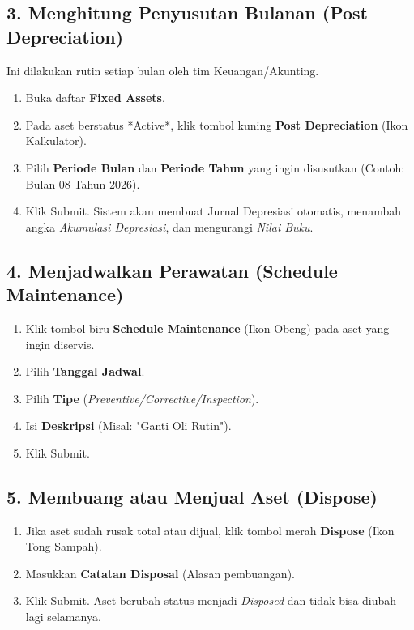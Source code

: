 \subsection{3. Menghitung Penyusutan Bulanan (Post Depreciation)}
Ini dilakukan rutin setiap bulan oleh tim Keuangan/Akunting.
\begin{enumerate}
    \item Buka daftar \textbf{Fixed Assets}.
    \item Pada aset berstatus *Active*, klik tombol kuning \textbf{Post Depreciation} (Ikon Kalkulator).
    \item Pilih \textbf{Periode Bulan} dan \textbf{Periode Tahun} yang ingin disusutkan (Contoh: Bulan 08 Tahun 2026).
    \item Klik Submit. Sistem akan membuat Jurnal Depresiasi otomatis, menambah angka \textit{Akumulasi Depresiasi}, dan mengurangi \textit{Nilai Buku}.
\end{enumerate}

\subsection{4. Menjadwalkan Perawatan (Schedule Maintenance)}
\begin{enumerate}
    \item Klik tombol biru \textbf{Schedule Maintenance} (Ikon Obeng) pada aset yang ingin diservis.
    \item Pilih \textbf{Tanggal Jadwal}.
    \item Pilih \textbf{Tipe} (\textit{Preventive/Corrective/Inspection}).
    \item Isi \textbf{Deskripsi} (Misal: "Ganti Oli Rutin").
    \item Klik Submit.
\end{enumerate}

\subsection{5. Membuang atau Menjual Aset (Dispose)}
\begin{enumerate}
    \item Jika aset sudah rusak total atau dijual, klik tombol merah \textbf{Dispose} (Ikon Tong Sampah).
    \item Masukkan \textbf{Catatan Disposal} (Alasan pembuangan).
    \item Klik Submit. Aset berubah status menjadi \textit{Disposed} dan tidak bisa diubah lagi selamanya.
\end{enumerate}
